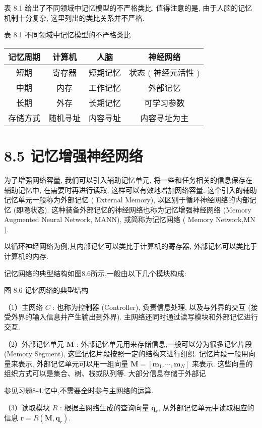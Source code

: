 \documentclass[10pt]{article}
\begin{document}
表 8.1 给出了不同领域中记忆模型的不严格类比. 值得注意的是, 由于人脑的记忆机制十分复杂, 这里列出的类比关系并不严格.

表 8.1 不同领域中记忆模型的不严格类比

\begin{center}
\begin{tabular}{cccc}
\hline
记忆周期 & 计算机 & 人脑 & 神经网络 \\
\hline
短期 & 寄存器 & 短期记忆 & 状态 ( 神经元活性 ) \\
中期 & 内存 & 工作记忆 & 外部记忆 \\
长期 & 外存 & 长期记忆 & 可学习参数 \\
\hline
存储方式 & 随机寻址 & 内容寻址 & 内容寻址为主 \\
\hline
\end{tabular}
\end{center}

\section*{8.5 记忆增强神经网络}
为了增强网络容量, 我们可以引入辅助记忆单元, 将一些和任务相关的信息保存在辅助记忆中, 在需要时再进行读取, 这样可以有效地增加网络容量. 这个引入的辅助记忆单元一般称为外部记忆 ( External Memory), 以区别于循环神经网络的内部记忆 (即隐状态). 这种装备外部记忆的神经网络也称为记忆增强神经网络 (Memory Augmented Neural Network, MANN), 或简称为记忆网络 ( Memory Network,MN ).

以循环神经网络为例,其内部记忆可以类比于计算机的寄存器, 外部记忆可以类比于计算机的内存.

记忆网络的典型结构如图8.6所示,一般由以下几个模块构成:



图 8.6 记忆网络的典型结构

（1）主网络 $C$ : 也称为控制器 (Controller), 负责信息处理, 以及与外界的交互 (接受外界的输入信息并产生输出到外界). 主网络还同时通过读写模块和外部记忆进行交互.

（2）外部记忆单元 $\boldsymbol{M}$ : 外部记忆单元用来存储信息,一般可以分为很多记忆片段 (Memory Segment), 这些记忆片段按照一定的结构来进行组织. 记忆片段一般用向量来表示, 外部记忆单元可以用一组向量 $\boldsymbol{M}=\left[\boldsymbol{m}_{1}, \cdots, \boldsymbol{m}_{N}\right]$ 来表示. 这些向量的组织方式可以是集合、树、栈或队列等. 大部分信息存储于外部记

参见习题8-4.忆中,不需要全时参与主网络的运算.

（3）读取模块 $R$ : 根据主网络生成的查询向量 $\boldsymbol{q}_{r}$, 从外部记忆单元中读取相应的信息 $\boldsymbol{r}=R\left(\boldsymbol{M}, \boldsymbol{q}_{r}\right)$.
\end{document}
